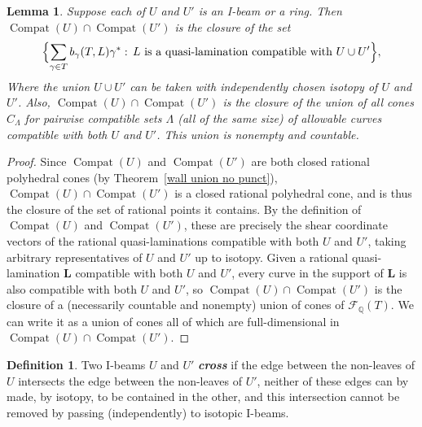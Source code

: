 \documentclass{amsart}
\newtheorem{lemma}[proposition]{Lemma}
\theoremstyle{definition}
\newtheorem{definition}[proposition]{Definition}
\theoremstyle{remark}
\numberwithin{equation}{section}
\newcommand{\newword}[1]{\textbf{\emph{#1}}}
\newcommand{\rationals}{\mathbb Q}
\newcommand{\settt}[1]{{\Bigl\lbrace #1 \Bigr\rbrace}}
\newcommand{\F}{{\mathcal F}}
\newcommand{\0}{{\mathbf{0}}}
\renewcommand{\L}{\mathbf{L}}
\newcommand{\Compat}{\operatorname{Compat}}
\begin{document}
\begin{lemma}\label{DTL gen int prop}
Suppose each of $U$ and $U'$ is an I-beam or a ring.  
Then $\Compat(U)\cap\Compat(U')$ is the closure of the set 
\[\settt{\sum_{\gamma\in T}b_\gamma(T,L)\gamma^*:\,L\text{ is a quasi-lamination compatible with }U\cup U'},\]
Where the union $U\cup U'$ can be taken with independently chosen isotopy of $U$ and $U'$.	
Also, $\Compat(U)\cap\Compat(U')$ is the closure of the union of all cones $C_{\Lambda}$ for pairwise compatible sets $\Lambda$ (all of the same size) of allowable curves compatible with both $U$ and $U'$.
This union is nonempty and countable.
\end{lemma}
\begin{proof}
Since $\Compat(U)$ and $\Compat(U')$ are both closed rational polyhedral cones (by Theorem~\ref{wall union no punct}), $\Compat(U)\cap\Compat(U')$ is a closed rational polyhedral cone, and is thus the closure of the set of rational points it contains.
By the definition of $\Compat(U)$ and $\Compat(U')$, these are precisely the shear coordinate vectors of the rational quasi-laminations compatible with both $U$ and $U'$, taking arbitrary representatives of $U$ and $U'$ up to isotopy.
Given a rational quasi-lamination $\L$ compatible with both $U$ and $U'$, every curve in the support of $\L$ is also compatible with both $U$ and $U'$, so $\Compat(U)\cap\Compat(U')$ is the closure of a (necessarily countable and nonempty) union of cones of $\F_\rationals(T)$.
We can write it as a union of cones all of which are full-dimensional in $\Compat(U)\cap\Compat(U')$.
\end{proof}

\begin{definition}\label{Ibeam cross def}
Two I-beams $U$ and $U'$ \newword{cross} if the edge between the non-leaves of $U$ intersects the edge between the non-leaves of $U'$, neither of these edges can by made, by isotopy, to be contained in the other, and this intersection cannot be removed by passing (independently) to isotopic I-beams.
\end{definition}
\end{document}
